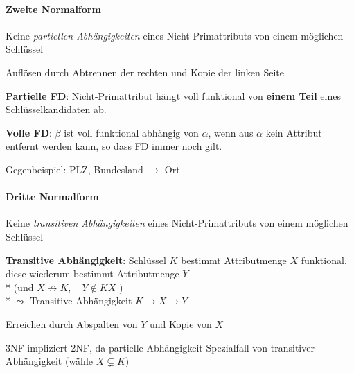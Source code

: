\paragraph{Zweite Normalform}
\begin{items}
	\item Keine \emph{partiellen Abhängigkeiten} eines Nicht-Primattributs von einem möglichen Schlüssel
	\item Auflösen durch Abtrennen der rechten und Kopie der linken Seite
	\item \textbf{Partielle FD}: Nicht-Primattribut hängt voll funktional von \textbf{einem Teil} eines Schlüsselkandidaten ab.
	\item \textbf{Volle FD}: \( \beta \) ist voll funktional abhängig von \( \alpha \), wenn aus \( \alpha \) kein Attribut entfernt werden kann, so dass FD immer noch gilt.
	\item Gegenbeispiel: PLZ, Bundesland \( \to \) Ort
\end{items}

\paragraph{Dritte Normalform}
\begin{items}
	\item Keine \emph{transitiven Abhängigkeiten} eines Nicht-Primattributs von einem möglichen Schlüssel
	\item \textbf{Transitive Abhängigkeit}: Schlüssel \( K \) bestimmt Attributmenge \( X \) funktional, diese wiederum bestimmt Attributmenge \( Y \) \\* 
	(und $X \nrightarrow K, \quad Y \notin KX$ ) \\*
	\( \leadsto \) Transitive Abhängigkeit \(K  \to X \to Y \)
	\item Erreichen durch Abspalten von \( Y \) und Kopie von \( X \)
	\item 3NF impliziert 2NF, da partielle Abhängigkeit Spezialfall von transitiver Abhängigkeit (wähle $X \subsetneq K$)
\end{items}

